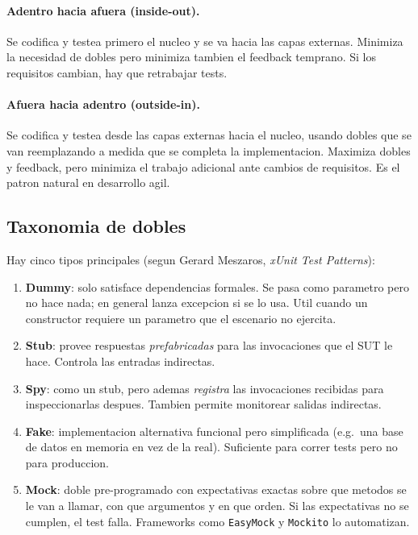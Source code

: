 \documentclass[12pt,a4paper]{article}
\begin{document}
\paragraph{Adentro hacia afuera (inside-out).} Se codifica y testea primero el nucleo y se va
hacia las capas externas. Minimiza la necesidad de dobles pero minimiza tambien el feedback
temprano. Si los requisitos cambian, hay que retrabajar tests.

\paragraph{Afuera hacia adentro (outside-in).} Se codifica y testea desde las capas externas
hacia el nucleo, usando dobles que se van reemplazando a medida que se completa la
implementacion. Maximiza dobles y feedback, pero minimiza el trabajo adicional ante cambios
de requisitos. Es el patron natural en desarrollo agil.

\subsection{Taxonomia de dobles}

Hay cinco tipos principales (segun Gerard Meszaros, \emph{xUnit Test Patterns}):

\begin{enumerate}
  \item \textbf{Dummy}: solo satisface dependencias formales. Se pasa como parametro pero no
  hace nada; en general lanza excepcion si se lo usa. Util cuando un constructor requiere un
  parametro que el escenario no ejercita.
  \item \textbf{Stub}: provee respuestas \emph{prefabricadas} para las invocaciones que el
  SUT le hace. Controla las entradas indirectas.
  \item \textbf{Spy}: como un stub, pero ademas \emph{registra} las invocaciones recibidas
  para inspeccionarlas despues. Tambien permite monitorear salidas indirectas.
  \item \textbf{Fake}: implementacion alternativa funcional pero simplificada (e.g.\ una base
  de datos en memoria en vez de la real). Suficiente para correr tests pero no para
  produccion.
  \item \textbf{Mock}: doble pre-programado con expectativas exactas sobre que metodos se le
  van a llamar, con que argumentos y en que orden. Si las expectativas no se cumplen, el
  test falla. Frameworks como \texttt{EasyMock} y \texttt{Mockito} lo automatizan.
\end{enumerate}
\end{document}
